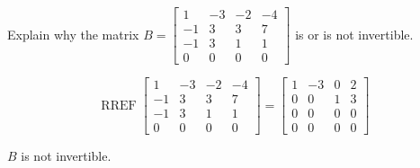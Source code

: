 
\begin{exerciseStatement}


Explain why the matrix \(B= \left[\begin{array}{cccc}
1 & -3 & -2 & -4 \\
-1 & 3 & 3 & 7 \\
-1 & 3 & 1 & 1 \\
0 & 0 & 0 & 0
\end{array}\right] \) is or is not invertible.


\end{exerciseStatement}
    
\begin{exerciseAnswer} 


\[\operatorname{RREF} \left[\begin{array}{cccc}
1 & -3 & -2 & -4 \\
-1 & 3 & 3 & 7 \\
-1 & 3 & 1 & 1 \\
0 & 0 & 0 & 0
\end{array}\right] = \left[\begin{array}{cccc}
1 & -3 & 0 & 2 \\
0 & 0 & 1 & 3 \\
0 & 0 & 0 & 0 \\
0 & 0 & 0 & 0
\end{array}\right] \]

\(B\) is not invertible.
\end{exerciseAnswer}
    
